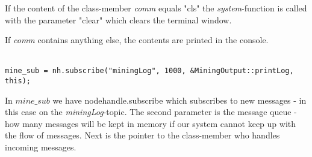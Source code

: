 If the content of the class-member \textit{comm} equals "cls" the \textit{system}-function is called with the parameter "clear" which clears the terminal window.

If \textit{comm} contains anything else, the contents are printed in the console.\\
\\
\begin{lstlisting}
mine_sub = nh.subscribe("miningLog", 1000, &MiningOutput::printLog, this);
\end{lstlisting}
In $mine\_sub$ we have nodehandle.subscribe which subscribes to new messages - in this case on the \textit{miningLog}-topic. The second parameter is the message queue - how many messages will be kept in memory if our system cannot keep up with the flow of messages. Next is the pointer to the class-member who handles incoming messages.